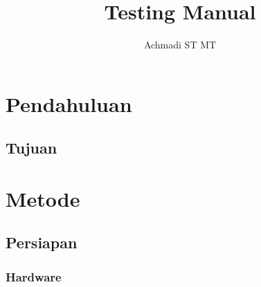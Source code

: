 \documentclass[12pt,]{article}
\title{\Large \bf
	Testing Manual\\
}
\author{Achmadi ST MT}
\date{}
\newcommand{\ShowOsVersion}{
	\immediate\write18{\unexpanded{foo=`uname -sro` && echo "${foo}" > tmp.tex}}
	\immediate\write18{rm tmp.tex}
}
\newcommand{\ShowTexVersion}{
	\immediate\write18{\unexpanded{foo=`pdflatex -version | head -n1 | cut -d' ' -f1,2` && echo "${foo}" > tmp.tex}}
	\immediate\write18{rm tmp.tex}
}
\begin{document}
	\maketitle
	\thispagestyle{empty}
	
	\vspace*{300pt}
	
	
	
	\newpage
	\tableofcontents
	
	
	\newpage
	\section{Pendahuluan}
	
	\subsection{Tujuan}
	
	\section{Metode}
	
	\newpage
	\subsection{Persiapan}
	
	\subsubsection{Hardware}
	
\end{document}
